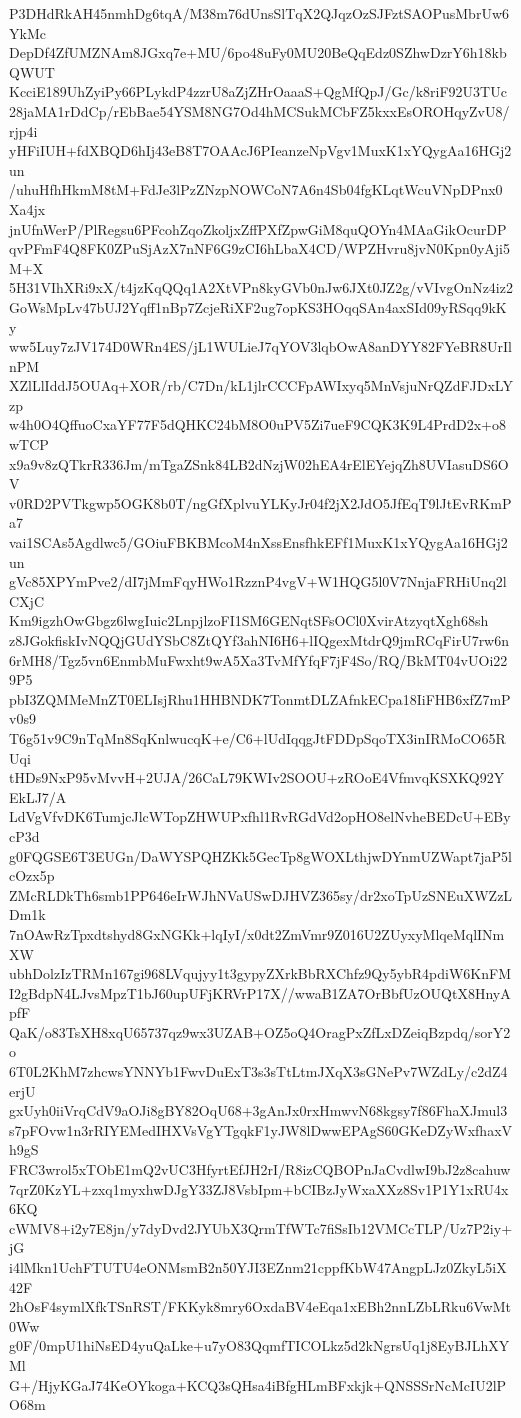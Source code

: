 P3DHdRkAH45nmhDg6tqA/M38m76dUnsSlTqX2QJqzOzSJFztSAOPusMbrUw6YkMc
DepDf4ZfUMZNAm8JGxq7e+MU/6po48uFy0MU20BeQqEdz0SZhwDzrY6h18kbQWUT
KcciE189UhZyiPy66PLykdP4zzrU8aZjZHrOaaaS+QgMfQpJ/Gc/k8riF92U3TUc
28jaMA1rDdCp/rEbBae54YSM8NG7Od4hMCSukMCbFZ5kxxEsOROHqyZvU8/rjp4i
yHFiIUH+fdXBQD6hIj43eB8T7OAAcJ6PIeanzeNpVgv1MuxK1xYQygAa16HGj2un
/uhuHfhHkmM8tM+FdJe3lPzZNzpNOWCoN7A6n4Sb04fgKLqtWcuVNpDPnx0Xa4jx
jnUfnWerP/PlRegsu6PFcohZqoZkoljxZffPXfZpwGiM8quQOYn4MAaGikOcurDP
qvPFmF4Q8FK0ZPuSjAzX7nNF6G9zCI6hLbaX4CD/WPZHvru8jvN0Kpn0yAji5M+X
5H31VIhXRi9xX/t4jzKqQQq1A2XtVPn8kyGVb0nJw6JXt0JZ2g/vVIvgOnNz4iz2
GoWsMpLv47bUJ2Yqff1nBp7ZcjeRiXF2ug7opKS3HOqqSAn4axSId09yRSqq9kKy
ww5Luy7zJV174D0WRn4ES/jL1WULieJ7qYOV3lqbOwA8anDYY82FYeBR8UrIlnPM
XZlLlIddJ5OUAq+XOR/rb/C7Dn/kL1jlrCCCFpAWIxyq5MnVsjuNrQZdFJDxLYzp
w4h0O4QffuoCxaYF77F5dQHKC24bM8O0uPV5Zi7ueF9CQK3K9L4PrdD2x+o8wTCP
x9a9v8zQTkrR336Jm/mTgaZSnk84LB2dNzjW02hEA4rElEYejqZh8UVIasuDS6OV
v0RD2PVTkgwp5OGK8b0T/ngGfXplvuYLKyJr04f2jX2JdO5JfEqT9lJtEvRKmPa7
vai1SCAs5Agdlwc5/GOiuFBKBMcoM4nXssEnsfhkEFf1MuxK1xYQygAa16HGj2un
gVc85XPYmPve2/dI7jMmFqyHWo1RzznP4vgV+W1HQG5l0V7NnjaFRHiUnq2lCXjC
Km9igzhOwGbgz6lwgIuic2LnpjlzoFI1SM6GENqtSFsOCl0XvirAtzyqtXgh68sh
z8JGokfiskIvNQQjGUdYSbC8ZtQYf3ahNI6H6+lIQgexMtdrQ9jmRCqFirU7rw6n
6rMH8/Tgz5vn6EnmbMuFwxht9wA5Xa3TvMfYfqF7jF4So/RQ/BkMT04vUOi229P5
pbI3ZQMMeMnZT0ELIsjRhu1HHBNDK7TonmtDLZAfnkECpa18IiFHB6xfZ7mPv0s9
T6g51v9C9nTqMn8SqKnlwucqK+e/C6+lUdIqqgJtFDDpSqoTX3inIRMoCO65RUqi
tHDs9NxP95vMvvH+2UJA/26CaL79KWIv2SOOU+zROoE4VfmvqKSXKQ92YEkLJ7/A
LdVgVfvDK6TumjcJlcWTopZHWUPxfhl1RvRGdVd2opHO8elNvheBEDcU+EBycP3d
g0FQGSE6T3EUGn/DaWYSPQHZKk5GecTp8gWOXLthjwDYnmUZWapt7jaP5lcOzx5p
ZMcRLDkTh6smb1PP646eIrWJhNVaUSwDJHVZ365sy/dr2xoTpUzSNEuXWZzLDm1k
7nOAwRzTpxdtshyd8GxNGKk+lqIyI/x0dt2ZmVmr9Z016U2ZUyxyMlqeMqlINmXW
ubhDolzIzTRMn167gi968LVqujyy1t3gypyZXrkBbRXChfz9Qy5ybR4pdiW6KnFM
I2gBdpN4LJvsMpzT1bJ60upUFjKRVrP17X//wwaB1ZA7OrBbfUzOUQtX8HnyApfF
QaK/o83TsXH8xqU65737qz9wx3UZAB+OZ5oQ4OragPxZfLxDZeiqBzpdq/sorY2o
6T0L2KhM7zhcwsYNNYb1FwvDuExT3s3sTtLtmJXqX3sGNePv7WZdLy/c2dZ4erjU
gxUyh0iiVrqCdV9aOJi8gBY82OqU68+3gAnJx0rxHmwvN68kgsy7f86FhaXJmul3
s7pFOvw1n3rRIYEMedIHXVsVgYTgqkF1yJW8lDwwEPAgS60GKeDZyWxfhaxVh9gS
FRC3wrol5xTObE1mQ2vUC3HfyrtEfJH2rI/R8izCQBOPnJaCvdlwI9bJ2z8cahuw
7qrZ0KzYL+zxq1myxhwDJgY33ZJ8VsbIpm+bCIBzJyWxaXXz8Sv1P1Y1xRU4x6KQ
cWMV8+i2y7E8jn/y7dyDvd2JYUbX3QrmTfWTc7fiSsIb12VMCcTLP/Uz7P2iy+jG
i4lMkn1UchFTUTU4eONMsmB2n50YJI3EZnm21cppfKbW47AngpLJz0ZkyL5iX42F
2hOsF4symlXfkTSnRST/FKKyk8mry6OxdaBV4eEqa1xEBh2nnLZbLRku6VwMt0Ww
g0F/0mpU1hiNsED4yuQaLke+u7yO83QqmfTICOLkz5d2kNgrsUq1j8EyBJLhXYMl
G+/HjyKGaJ74KeOYkoga+KCQ3sQHsa4iBfgHLmBFxkjk+QNSSSrNcMcIU2lPO68m
